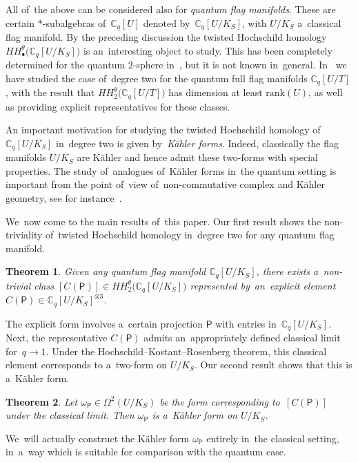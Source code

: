 \documentclass[10pt,a4paper]{amsart}
\numberwithin{equation}{section}
\newcommand{\CqU}{\mathbb{C}_q[U]}
\newcommand{\Cqflag}{\mathbb{C}_q[U / K_S]}
\newcommand{\Cqfullflag}{\mathbb{C}_q[U /T]}
\newcommand{\proj}{\mathsf{P}}
\newtheorem*{theorem*}{Theorem}
\begin{document}
All of~the above can be considered also for \emph{quantum flag manifolds}.
These are certain $*$-sub\-algebras of~$\CqU$ denoted by~$\Cqflag$, with $U / K_S$ a~classical flag manifold.
By the preceding discussion the twisted Hoch\-schild homology $HH^\theta_\bullet\big(\Cqflag\big)$ is an~interesting object to study.
This has been completely determined for the quantum $2$-sphere in~\cite{hadfield}, but it is not known in~general.
In~\cite{twist-hoch} we have studied the case of~degree two for the quantum full flag manifolds $\Cqfullflag$, with the result that $HH^\theta_2\big(\Cqfullflag\big)$ has dimension at least $\mathrm{rank}(U)$, as well as providing explicit representatives for these classes.

An important motivation for studying the twisted Hoch\-schild homology of~$\Cqflag$ in~degree two is given by~\emph{K\"ahler forms}.
Indeed, classically the flag manifolds $U / K_S$ are K\"ahler and hence admit these two-forms with special properties.
The study of~analogues of~K\"ahler forms in~the quantum setting is important from the point of~view of~non-commutative complex and K\"ahler geometry, see for instance~\cite{besm13, obu16, obu17}.

We~now come to the main results of~this paper.
Our first result shows the non-triviality of~twisted Hoch\-schild homology in~degree two for any quantum flag manifold.

\begin{theorem*}
Given any quantum flag manifold $\Cqflag$, there exists a~non-trivial class $[C(\proj)] \in HH^\theta_2\big(\Cqflag\big)$ represented by~an~explicit element $C(\proj) \in \Cqflag^{\otimes 3}$.
\end{theorem*}

The explicit form involves a~certain projection $\proj$ with entries in~$\Cqflag$.
Next, the representative $C(\proj)$ admits an~appropriately defined classical limit for~$q \to 1$.
Under the Hoch\-schild--Kostant--Rosenberg theorem, this classical element corresponds to a~two-form on $U / K_S$.
Our second result shows that this is a~K\"ahler form.

\begin{theorem*}
Let $\omega_\proj \in \Omega^2(U / K_S)$ be the form corresponding to~$[C(\proj)]$ under the classical limit.
Then $\omega_\proj$ is a~K\"ahler form on $U / K_S$.
\end{theorem*}

We~will actually construct the K\"ahler form $\omega_\proj$ entirely in~the classical setting, in~a~way which is suitable for comparison with the quantum case.
\end{document}
